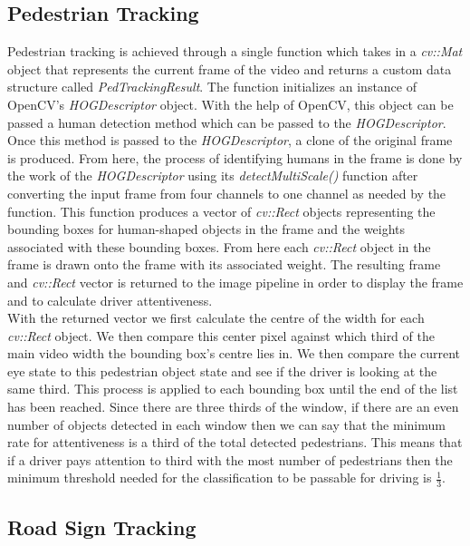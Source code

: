 \subsection{Pedestrian Tracking}
Pedestrian tracking is achieved through a single function which takes in a \emph{cv::Mat} object that represents the current frame of the video and returns a custom data structure called \emph{PedTrackingResult}. The function initializes an instance of OpenCV's \emph{HOGDescriptor} object. With the help of OpenCV, this object can be passed a human detection method which can be passed to the \emph{HOGDescriptor}. Once this method is passed to the \emph{HOGDescriptor}, a clone of the original frame is produced. From here, the process of identifying humans in the frame is done by the work of the \emph{HOGDescriptor} using its \emph{detectMultiScale()} function after converting the input frame from four channels to one channel as needed by the function. This function produces a vector of \emph{cv::Rect} objects representing the bounding boxes for human-shaped objects in the frame and the weights associated with these bounding boxes. From here each \emph{cv::Rect} object in the frame is drawn onto the frame with its associated weight. The resulting frame and \emph{cv::Rect} vector is returned to the image pipeline in order to display the frame and to calculate driver attentiveness.\\

With the returned vector we first calculate the centre of the width for each \emph{cv::Rect} object. We then compare this center pixel against which third of the main video width the bounding box's centre lies in. We then compare the current eye state to this pedestrian object state and see if the driver is looking at the same third. This process is applied to each bounding box until the end of the list has been reached. Since there are three thirds of the window, if there are an even number of objects detected in each window then we can say that the minimum rate for attentiveness is a third of the total detected pedestrians. This means that if a driver pays attention to third with the most number of pedestrians then the minimum threshold needed for the classification to be passable for driving is $\frac{1}{3}$.

\subsection{Road Sign Tracking}

